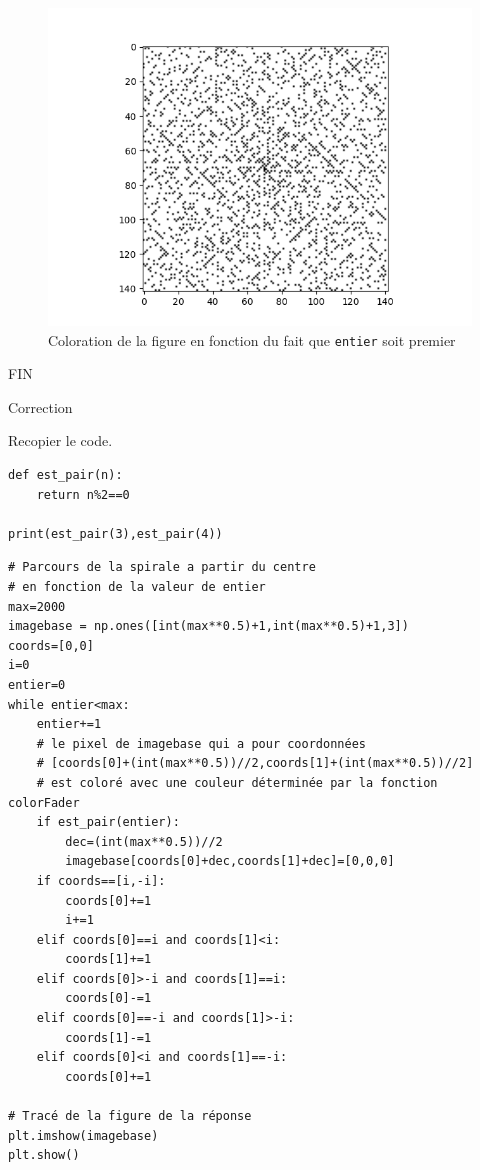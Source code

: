 \begin{figure}[!ht]
\centering\includegraphics[width=0.7\linewidth]{img/fig03}
\caption{\label{fig03} Coloration de la figure en fonction du fait que \texttt{entier} soit premier}
\end{figure}


\begin{center}
\Large{FIN}
\end{center}

\cleardoublepage

\ifdef{\public}{}{\pagestyle{correction}}

\begin{center}
\Large{Correction}
\end{center}

\reponse{}

Recopier le code.

\reponse{}

\begin{verbatim}
def est_pair(n):
    return n%2==0

print(est_pair(3),est_pair(4))
\end{verbatim}

\reponse{}

\begin{verbatim}
# Parcours de la spirale a partir du centre
# en fonction de la valeur de entier
max=2000
imagebase = np.ones([int(max**0.5)+1,int(max**0.5)+1,3])
coords=[0,0]
i=0
entier=0
while entier<max:
    entier+=1
    # le pixel de imagebase qui a pour coordonnées
    # [coords[0]+(int(max**0.5))//2,coords[1]+(int(max**0.5))//2]
    # est coloré avec une couleur déterminée par la fonction colorFader
    if est_pair(entier):
        dec=(int(max**0.5))//2
        imagebase[coords[0]+dec,coords[1]+dec]=[0,0,0]
    if coords==[i,-i]:
        coords[0]+=1
        i+=1
    elif coords[0]==i and coords[1]<i:
        coords[1]+=1
    elif coords[0]>-i and coords[1]==i:
        coords[0]-=1
    elif coords[0]==-i and coords[1]>-i:
        coords[1]-=1
    elif coords[0]<i and coords[1]==-i:
        coords[0]+=1

# Tracé de la figure de la réponse
plt.imshow(imagebase)
plt.show()
\end{verbatim}

